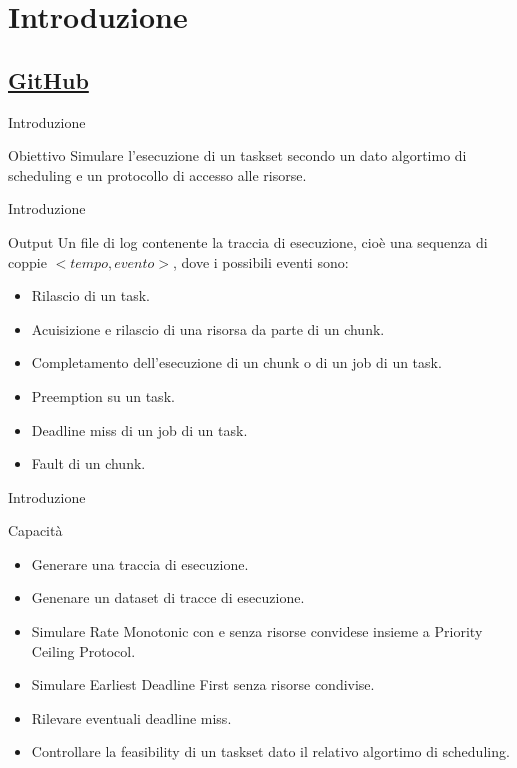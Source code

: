 \section{Introduzione}
\subsection{\href{https://github.com/edoardosarri24/real-time-scheduling-simulator.git}{GitHub}}

\begin{frame}{Introduzione}
    \begin{block}{Obiettivo}
        Simulare l'esecuzione di un taskset secondo un dato algortimo di scheduling e un protocollo di accesso alle risorse.
    \end{block}
\end{frame}

\begin{frame}{Introduzione}
    \begin{block}{Output}
        Un file di log contenente la traccia di esecuzione, cioè una sequenza di coppie $<tempo,evento>$, dove i possibili eventi sono:
        \begin{itemize}
            \item Rilascio di un task.
            \item Acuisizione e rilascio di una risorsa da parte di un chunk.
            \item Completamento dell'esecuzione di un chunk o di un job di un task.
            \item Preemption su un task.
            \item Deadline miss di un job di un task.
            \item Fault di un chunk.
        \end{itemize}
    \end{block}
\end{frame}

\begin{frame}{Introduzione}
    \begin{block}{Capacità}
        \begin{itemize}
            \item Generare una traccia di esecuzione.
            \item Genenare un dataset di tracce di esecuzione.
            \item Simulare Rate Monotonic con e senza risorse convidese insieme a Priority Ceiling Protocol.
            \item Simulare Earliest Deadline First senza risorse condivise.
            \item Rilevare eventuali deadline miss.
            \item Controllare la feasibility di un taskset dato il relativo algortimo di scheduling.
        \end{itemize}
    \end{block}
\end{frame}

